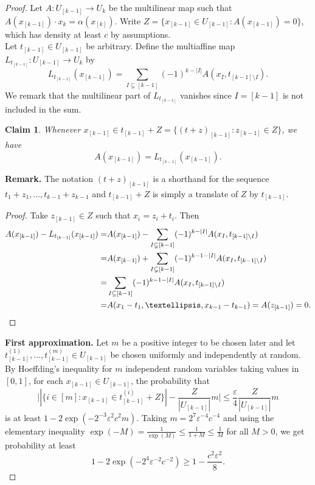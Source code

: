 \documentclass[10pt,a4paper]{amsart}
\newtheorem{claim}{Claim}
\begin{document}
\begin{proof}
    Let $A: U_{[k-1]} \to U_k$ be the multilinear map such that $A(x_{[k-1]}) \cdot x_k = \alpha(x_{[k]})$. Write $Z = \{x_{[k-1]} \in U_{[k-1]} : A(x_{[k-1]}) = 0\}$, which has density at least $c$ by assumptions.\\

    Let $t_{[k-1]} \in U_{[k-1]}$ be arbitrary. Define the multiaffine map $L_{t_{[k-1]}} : U_{[k-1]} \to U_k$ by
    \[L_{t_{[k-1]}}(x_{[k-1]}) = \sum_{I \subsetneq [k-1]} (-1)^{k - |I|} A(x_I, t_{[k-1] \setminus I}).\]
    We remark that the multilinear part of $L_{t_{[k-1]}}$ vanishes since $I = [k-1]$ is not included in the sum.

    \begin{claim}\label{relationLandA}
        Whenever $x_{[k-1]} \in t_{[k-1]} + Z = \{(t+z)_{[k-1]} : z_{[k-1]} \in Z\}$, we have
        \[A(x_{[k-1]}) = L_{t_{[k-1]}}(x_{[k-1]}).\]
    \end{claim}

    \noindent\textbf{Remark.} The notation $(t+z)_{[k-1]}$ is a shorthand for the sequence $t_1 + z_1, \dots, t_{k-1} + z_{k-1}$ and $t_{[k-1]} + Z$ is simply a translate of $Z$ by $t_{[k-1]}$.\\

    \begin{proof}
        Take $z_{[k-1]} \in Z$ such that $x_i  = z_i + t_i$. Then
        \begin{align*}A(x_{[k-1]}) - L_{t_{[k-1]}}(x_{[k-1]}) = &A(x_{[k-1]})- \sum_{I \subsetneq [k-1]} (-1)^{k - |I|} A(x_I, t_{[k-1] \setminus I}) \\
        = &A(x_{[k-1]}) + \sum_{I \subsetneq [k-1]} (-1)^{k - 1 - |I|} A(x_I, t_{[k-1] \setminus I})\\
        = &\sum_{I \subseteq [k-1]} (-1)^{k - 1 - |I|} A(x_I, t_{[k-1] \setminus I})\\
        = &A(x_1 - t_1, \dots, x_{k-1} - t_{k-1}) = A(z_{[k-1]}) = 0.\qedhere\end{align*}
    \end{proof}

    \noindent\textbf{First approximation.} Let $m$ be a positive integer to be chosen later and let $t^{(1)}_{[k-1]}, \dots, t^{(m)}_{[k-1]} \in U_{[k-1]}$ be chosen uniformly and independently at random. By Hoeffding's inequality for $m$ independent random variables taking values in $[0,1]$, for each $x_{[k-1]} \in U_{[k-1]}$, the probability that 
    \begin{equation} \label{prbabilitybound} \Big||\{i \in [m]: x_{[k-1]} \in t^{(i)}_{[k-1]} + Z\}| - \frac{Z}{|U_{[k-1]}|}m\Big| \leq \frac{\varepsilon}{4} \frac{Z}{|U_{[k-1]}|}m \end{equation}
    is at least $1 - 2\exp(- 2^{-3}\varepsilon^2 c^2 m)$. Taking $m = 2^{7}\varepsilon^{-4} c^{-4}$ and using the elementary inequality $\exp(-M) = \frac{1}{\exp(M)} \leq \frac{1}{1 + M}\leq \frac{1}{M}$ for all $M > 0$, we get probability at least
    \[1 - 2\exp(- 2^{4}\varepsilon^{-2} c^{-2}) \geq 1 - \frac{c^2\varepsilon^2}{8}.\]


\end{proof}
\end{document}
